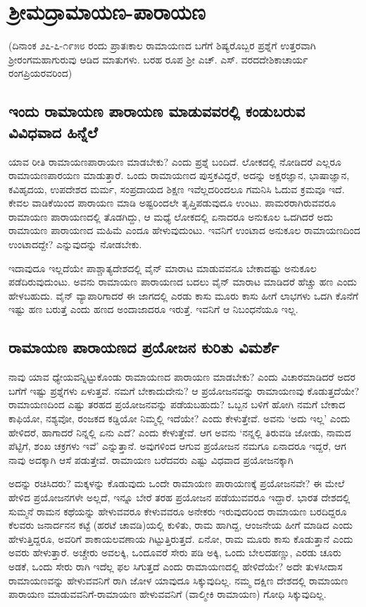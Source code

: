 \chapter{ಶ್ರೀಮದ್ರಾಮಾಯಣ-ಪಾರಾಯಣ} 

(ದಿನಾಂಕ ೨೭-೭-೧೯೫೮ ರಂದು ಪ್ರಾತಃಕಾಲ ರಾಮಾಯಣದ ಬಗೆಗೆ ಶಿಷ್ಯರೊಬ್ಬರ ಪ್ರಶ್ನೆಗೆ ಉತ್ತರವಾಗಿ ಶ್ರೀರಂಗಮಹಾಗುರುವು ಆಡಿದ ಮಾತುಗಳು. ಬರಹ ರೂಪ ಶ್ರೀ ಎಚ್‍. ಎಸ್‍. ವರದದೇಶಿಕಾಚಾರ್ಯ ರಂಗಪ್ರಿಯರವರಿಂದ) 

\section*{ಇಂದು ರಾಮಾಯಣ ಪಾರಾಯಣ ಮಾಡುವವರಲ್ಲಿ ಕಂಡುಬರುವ ವಿವಿಧವಾದ ಹಿನ್ನೆಲೆ} 

ಯಾವ ರೀತಿ ರಾಮಾಯಣಪಾರಾಯಣ ಮಾಡಬೇಕು? ಎಂದು ಪ್ರಶ್ನೆ ಬಂದಿದೆ. ಲೋಕದಲ್ಲಿ ನೋಡಿದರೆ ಎಲ್ಲರೂ ರಾಮಾಯಣಪಾರಯಣ ಮಾಡುತ್ತಾರೆ. ಒಂದು ರಾಮಾಯಣದ ಪುಸ್ತಕವಿದ್ದರೆ, ಅದನ್ನು ಅಕ್ಷರಜ್ಞಾನ, ಭಾಷಾಜ್ಞಾನ, ಕವಿಹೃದಯ, ಉಪದೇಶದ ಮರ್ಮ, ಸಂಪ್ರದಾಯದ ಶಿಕ್ಷಣ ಇವೆಲ್ಲದರಿಂದಲೂ ಗಮನಿಸಿ ಓದುವ ಕ್ರಮವೂ ಇದೆ. ಕೇವಲ ವಾಡಿಕೆಯಿಂದ ಪಾರಾಯಣ ಮಾಡಿ ಅಷ್ಟರಿಂದಲೇ ತೃಪ್ತಿಪಡುವುದೂ ಉಂಟು. ಪಾಮರರಾಗಿರುವವರೂ ರಾಮಾಯಣ ಪಾರಾಯಣದಲ್ಲಿ ತೊಡಗಿದ್ದು, ಆ ಮಧ್ಯೆ ಲೋಕದಲ್ಲಿ ಏನಾದರೂ ಅನುಕೂಲ ಒದಗಿದರೆ ಅದು ರಾಮಾಯಣ ಪಾರಾಯಣದ ಮಹಿಮೆ ಎಂದೂ ಹೇಳುವುದುಂಟು. ಇವನಿಗೆ ಉಂಟಾದ ಅನುಕೂಲ ರಾಮಾಯಣದಿಂದ ಉಂಟಾದದ್ದೇ? ಎನ್ನುವುದನ್ನು ನೋಡಬೇಕು. 

ಇದಾವುದೂ ಇಲ್ಲದೆಯೇ ಪಾಶ್ಚಾತ್ಯದೇಶದಲ್ಲಿ ವೈನ್‍ ಮಾರಾಟ ಮಾಡುವವನೂ ಬೇಕಾದಷ್ಟು ಅನುಕೂಲ ಪಡೆದಿರುವುದುಂಟು. ಅವನು ರಾಮಾಯಣ ಪಾರಾಯಣದ ಬದಲು ವೈನ್‍ ಮಾರಾಟ ಮಾಡಿದರೆ ಹೆಚ್ಚು ಹಣ ಎಂದು ಹೇಳಬಹುದು. ವೈನ್‍ ವ್ಯಾಪಾರಿಗಾದರೆ ಈ ಜಾಗದಲ್ಲಿ ಎರಡು ಕಾಸು ಮೂರು ಕಾಸು ಹೀಗೆ ಲಾಭಗಳು ಒದಗಿ ಕೊನೆಗೆ ಇಷ್ಟು ಹಣ ಬರುತ್ತೆ ಎಂದು ಹಣದ ಅಂದಾಜಾದರೂ ಇರುತ್ತೆ. ಇವನಿಗೆ ಆ ನಿಬಂಧನೆಯೂ ಇಲ್ಲ. 

\section*{ರಾಮಾಯಣ ಪಾರಾಯಣದ ಪ್ರಯೋಜನ ಕುರಿತು ವಿಮರ್ಶೆ} 

ನಾವು ಯಾವ ಧ್ಯೇಯವನ್ನಿಟ್ಟುಕೊಂಡು ರಾಮಾಯಣದ ಪಾರಾಯಣ ಮಾಡಬೇಕು? ಎಂದು ವಿಚಾರಮಾಡಿದರೆ ಅದರ ಬಗೆಗೆ ಇಷ್ಟು ಪ್ರಶ್ನೆಗಳು ಏಳುತ್ತವೆ. ನಮಗೆ ಬೇಕಾದುದೇನು? ಆ ಪ್ರಯೋಜನವನ್ನು ರಾಮಾಯಣವು ಕೊಡುತ್ತದೆಯೇ? ರಾಮಾಯಣದಿಂದ ಎಷ್ಟು ತರಹದ ಪ್ರಯೋಜನವನ್ನು ಪಡೆಯಬಹುದು? ಒಬ್ಬನ ಬಳಿಗೆ ಹೋಗಿ ನಮಗೆ ಬೇಕಾದ ಕಾಫಿಯೋ, ನಶ್ಯವೋ, ರಂಜಕದ ಕಡ್ಡಿಯೋ ನಿಮ್ಮಲ್ಲಿ ಇದೆಯೇ? ಎಂದು ಕೇಳುತ್ತೇವೆ. ಅವನು `ಅದು ಇಲ್ಲ' ಎಂದು ಹೇಳಿದರೆ, ಹಾಗಾದರೆ ನಿನ್ನಲ್ಲಿ ಏನು ಎದೆ? ಎಂದು ಕೇಳುತ್ತೇವೆ. ಆಗ ಅವನು `ನನ್ನಲ್ಲಿ ತಿರುವಡಿ ಜೋಡು, ನಾಮದ ಪೆಟ್ಟಿಗೆ, ಶಂಖ ಚಕ್ರಗಳು ಇವೆ' ಎನ್ನುತ್ತಾನೆ. ಅವುಗಳಿಂದ ಆಗುವ ಪ್ರಯೋಜನ ನಮಗೂ ಏನಾದರೂ ಇದ್ದರೆ, ಆಗ ನಾವು ಅದಕ್ಕಾಗಿ ಆಸೆ ಪಡುತ್ತೇವೆ. ರಾಮಾಯಣ ಬರೆದವರು ಎಷ್ಟು ವಿಧವಾದ ಪ್ರಯೋಜನಕ್ಕಾಗಿ 

ಅದನ್ನು ರಚಿಸಿದರು? ಮಕ್ಕಳನ್ನು ಕೊಡುವುದು ಒಂದೇ ರಾಮಾಯಣ ಪಾರಾಯಣಕ್ಕೆ ಪ್ರಯೋಜನವೇ? ಈ ಮೇಲೆ ಹೇಳಿದ ಪ್ರಯೋಜನಗಳೇ ಅಲ್ಲದೆ, ಇನ್ನೂ ಬೇರೆ ತರಹ ಪ್ರಯೋಜನ ಪಡೆಯುವವರೂ ಇದ್ದಾರೆ. ಭಾರತ ದೇಶದಲ್ಲಿ ಸುಮ್ಮನೆ ರಾಮನ ಕಥೆಯನ್ನು ಹೇಳುವವರೂ ಕೇಳುವವರೂ ಅನೇಕರು ಇರುವುದರಿಂದ ರಾಮಾಯಣ ಬರದಿದ್ದರೂ ಕೆಲವರು ಜನಾರ್ದನನ ಕಟ್ಟೆ (ಹರಟೆ ಚಾವಡಿ)ಯಲ್ಲಿ ಕುಳಿತು, ರಾಮ ಹಾಗಿದ್ದ, ಆಂಜನೇಯ ಹೀಗೆ ಮಾಡಿದ ಎಂದು ಹೇಳುತ್ತಿದ್ದರೂ, ಅವರಿಗೆ ಶಾಕಾಯಲವಣಾಯ ಗಿಟ್ಟುತ್ತಿರುತ್ತದೆ. ಏನೋ, ರಾಮ ಮೂರು ಕಾಸು ಕೊಡುತ್ತಾನೆ ಎಂದು ಅವರು ಹೇಳುತ್ತಾರೆ. ಅಚ್ಚೇರು ಅವಲಕ್ಕಿ, ಒಂದೂವರೆ ಸೇರು ಪಡಿ ಅಕ್ಕಿ, ಒಂದು ಬೇಲದಹಣ್ಣು, ಎರಡು ಚೂರು ಅಡಕೆ, ಒಂದು ಸೇರು ರಾಗಿ ಇದೆಲ್ಲ ಫಲ ಸಿಗುತ್ತದೆ ಎಂದು ರಾಮಾಯಣದಲ್ಲಿ ಹೇಳಿದೆಯೇ? ಅದೇ ತುಳಸೀದಾಸ ರಾಮಾಯಣವನ್ನು ಹೇಳುವವನಿಗೆ ರಾಗಿ ಜೋಳ ಯಾವುದೂ ಸಿಕ್ಕುವುದಿಲ್ಲ. ನಮ್ಮ ದಕ್ಷಿಣ ದೇಶದಲ್ಲಿ ರಾಮಾಯಣ ಪಾರಾಯಣ ಮಾಡುವವನಿಗೆ-ರಾಮಾಯಣ ಹೇಳುವವನಿಗೆ (ವಾಲ್ಮೀಕಿ ರಾಮಾಯಣ) ಗೋಧಿ ಸಿಕ್ಕುವುದಿಲ್ಲ. 

